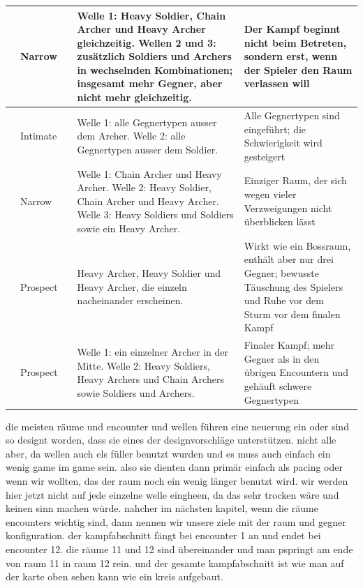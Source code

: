 \documentclass[../Main.tex]{subfiles}
\begin{document}
{\begin{longtable}{|>{\raggedright\arraybackslash}p{0.9cm}|>{\raggedright\arraybackslash}p{1.6cm}|>{\raggedright\arraybackslash}p{1.1cm}|>{\raggedright\arraybackslash}p{5.5cm}|>{\raggedright\arraybackslash}p{3.6cm}|}
        \hline
        8 & Narrow & 3 & Welle 1: Heavy Soldier, Chain Archer und Heavy Archer gleichzeitig. Wellen 2 und 3: zusätzlich Soldiers und Archers in wechselnden Kombinationen; insgesamt mehr Gegner, aber nicht mehr gleichzeitig. & Der Kampf beginnt nicht beim Betreten, sondern erst, wenn der Spieler den Raum verlassen will \\
        \hline
        9 & Intimate & 2 & Welle 1: alle Gegnertypen ausser dem Archer. Welle 2: alle Gegnertypen ausser dem Soldier. & Alle Gegnertypen sind eingeführt; die Schwierigkeit wird gesteigert \\
        \hline
        10 & Narrow & 3 & Welle 1: Chain Archer und Heavy Archer. Welle 2: Heavy Soldier, Chain Archer und Heavy Archer. Welle 3: Heavy Soldiers und Soldiers sowie ein Heavy Archer. & Einziger Raum, der sich wegen vieler Verzweigungen nicht überblicken lässt \\
        \hline
        11 & Prospect & 1 & Heavy Archer, Heavy Soldier und Heavy Archer, die einzeln nacheinander erscheinen. & Wirkt wie ein Bossraum, enthält aber nur drei Gegner; bewusste Täuschung des Spielers und Ruhe vor dem Sturm vor dem finalen Kampf \\
        \hline
        12 & Prospect & 2 & Welle 1: ein einzelner Archer in der Mitte. Welle 2: Heavy Soldiers, Heavy Archers und Chain Archers sowie Soldiers und Archers. & Finaler Kampf; mehr Gegner als in den übrigen Encountern und gehäuft schwere Gegnertypen \\
        \hline
    \end{longtable}
}

die meisten räume und encounter und wellen führen eine neuerung ein oder sind so designt worden, dass sie eines der designvorschläge unterstützen. nicht alle aber, da wellen auch els füller benutzt wurden und es muss auch einfach ein wenig game im game sein. also sie dienten dann primär einfach als pacing oder wenn wir wollten, das der raum noch ein wenig länger benutzt wird. wir werden hier jetzt nicht auf jede einzelne welle eingheen, da das sehr trocken wäre und keinen sinn machen würde. nahcher im nächsten kapitel, wenn die räume encounters wichtig sind, dann nennen wir unsere ziele mit der raum und gegner konfiguration. der kampfabschnitt fängt bei encounter 1 an und endet bei encounter 12. die räume 11 und 12 sind übereinander und man pspringt am ende von raum 11 in raum 12 rein. und der gesamte kampfabschnitt ist wie man auf der karte oben sehen kann wie ein kreis aufgebaut.
\end{document}
